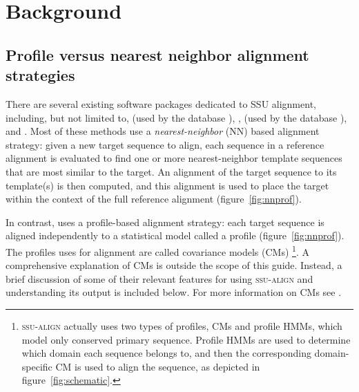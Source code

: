 \section{Background}
\label{sec:background}


\subsection{Profile versus nearest neighbor alignment strategies}

There are several existing software packages dedicated to
SSU alignment, including, but not limited to, 
\cite{DeSantis06} (used by the  database
\cite{DeSantis06a}),  \cite{Caporaso10},
 (used by the  database
\cite{Pruesse07}), and  \cite{Schloss09}.
Most of these methods use a \emph{nearest-neighbor}
(NN) based alignment strategy: given a new target sequence to align,
each sequence in a reference alignment is evaluated to find one or
more nearest-neighbor template sequences that are most similar to the
target. An alignment of the target sequence to its template(s) is then
computed, and this alignment is used to place the target within the
context of the full reference alignment (figure~\ref{fig:nnprof}).

In contrast,  uses a profile-based alignment
strategy: each target sequence is aligned independently to a
statistical model called a profile
(figure~\ref{fig:nnprof}). The profiles  uses for
alignment are called covariance models (CMs)
\footnote{\textsc{ssu-align} actually uses two types of profiles,
  CMs and profile HMMs, which model only conserved primary
  sequence. Profile HMMs are used to determine which domain each
  sequence belongs to, and then the corresponding domain-specific CM
  is used to align the sequence, as depicted in
  figure~\ref{fig:schematic}.}.
A comprehensive explanation of CMs is outside the scope of this
guide. Instead, a brief discussion of some of their relevant features
for using \textsc{ssu-align} and understanding its output is included
below. For more information on CMs see
\cite{Eddy94,Durbin98,Eddy02b,NawrockiEddy07,Nawrocki09,Nawrocki09b,KolbeEddy09}.

